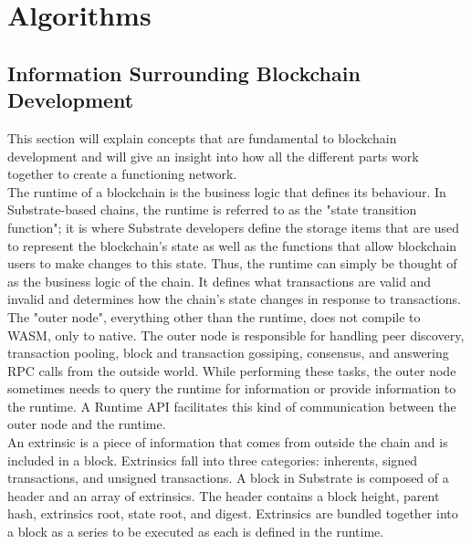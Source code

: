 \let\textcircled=\pgftextcircled
\chapter{Algorithms}
\renewcommand{\ttdefault}{pcr}

\section{Information Surrounding Blockchain Development}

This section will explain concepts that are fundamental to blockchain development and will give an insight into how all the different parts work together to create a functioning network. \\

The runtime of a blockchain is the business logic that defines its behaviour. In Substrate-based chains, the runtime is referred to as the "state transition function"; it is where Substrate developers define the storage items that are used to represent the blockchain's state as well as the functions that allow blockchain users to make changes to this state. Thus, the runtime can simply be thought of as the business logic of the chain. It defines what transactions are valid and invalid and determines how the chain's state changes in response to transactions.\\

The "outer node", everything other than the runtime, does not compile to WASM, only to native. The outer node is responsible for handling peer discovery, transaction pooling, block and transaction gossiping, consensus, and answering RPC calls from the outside world. While performing these tasks, the outer node sometimes needs to query the runtime for information or provide information to the runtime. A Runtime API facilitates this kind of communication between the outer node and the runtime. \\

An extrinsic is a piece of information that comes from outside the chain and is included in a block. Extrinsics fall into three categories: inherents, signed transactions, and unsigned transactions. A block in Substrate is composed of a header and an array of extrinsics. The header contains a block height, parent hash, extrinsics root, state root, and digest.  Extrinsics are bundled together into a block as a series to be executed as each is defined in the runtime. \\


